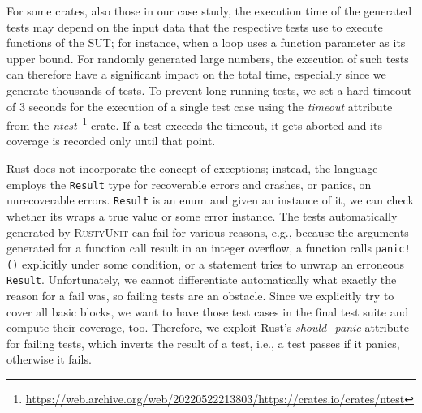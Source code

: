 \documentclass[paper=a4,%
  twoside,%
  BCOR4mm,%
  abstract=true,%
  toc=bibliography,%
  chapterprefix=true,%
  toc=bibliographynumbered,%
  open=right,%
  english,%
  pagesize=pdftex]{scrreprt}
\newcommand{\tech}{\textsc{RustyUnit}\xspace}
\newcommand{\sut}{\ac{SUT}\xspace}
\begin{document}

For some crates, also those in our case study, the execution time of the generated tests may depend on the input data that the respective tests use to execute functions of the \sut; for instance, when a loop uses a function parameter as its upper bound. For randomly generated large numbers, the execution of such tests can therefore have a significant impact on the total time, especially since we generate thousands of tests. To prevent long-running tests, we set a hard timeout of 3 seconds for the execution of a single test case using the \emph{timeout} attribute from the \emph{ntest}~\footnote{\url{https://web.archive.org/web/20220522213803/https://crates.io/crates/ntest}} crate. If a test exceeds the timeout, it gets aborted and its coverage is recorded only until that point.

Rust does not incorporate the concept of exceptions; instead, the language employs the \texttt{Result} type for recoverable errors and crashes, or panics, on unrecoverable errors. \texttt{Result} is an enum and given an instance of it, we can check whether its wraps a true value or some error instance.
The tests automatically generated by \tech can fail for various reasons, e.g., because the arguments generated for a function call result in an integer overflow, a function calls \texttt{panic!()} explicitly under some condition, or a statement tries to unwrap an erroneous \texttt{Result}. Unfortunately, we cannot differentiate automatically what exactly the reason for a fail was, so failing tests are an obstacle. Since we explicitly try to cover all basic blocks, we want to have those test cases in the final test suite and compute their coverage, too. Therefore, we exploit Rust's \emph{should\_panic} attribute for failing tests, which inverts the result of a test, i.e., a test passes if it panics, otherwise it fails.
\end{document}
